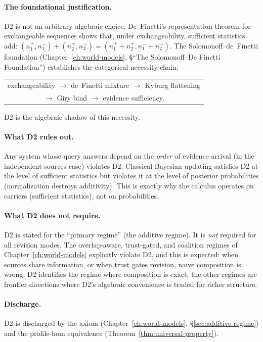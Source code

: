 \documentclass[11pt,openany]{report}
\begin{document}
\paragraph{The foundational justification.}
D2 is not an arbitrary algebraic choice.  De~Finetti's representation
theorem for exchangeable sequences shows that, under exchangeability,
sufficient statistics add: $(n_1^+, n_1^-) + (n_2^+, n_2^-) =
(n_1^+ + n_2^+, n_1^- + n_2^-)$.  The Solomonoff--de~Finetti
foundation (Chapter~\ref{ch:world-models}, \S``The Solomonoff--De
Finetti Foundation'') establishes the categorical necessity chain:
%
\begin{center}
\begin{tabular}{@{}c@{}}
exchangeability $\to$ de~Finetti mixture $\to$ Kyburg flattening \\
$\to$ Giry bind $\to$ evidence sufficiency.
\end{tabular}
\end{center}
%
\noindent
D2 is the algebraic shadow of this necessity.

\paragraph{What D2 rules out.}
Any system whose query answers depend on the \emph{order} of evidence
arrival (in the independent-sources case) violates D2.  Classical
Bayesian updating satisfies D2 at the level of sufficient statistics
but violates it at the level of posterior probabilities (normalization
destroys additivity).  This is exactly why the calculus operates on
carriers (sufficient statistics), not on probabilities.

\paragraph{What D2 does not require.}
D2 is stated for the ``primary regime'' (the additive regime).  It is
\emph{not} required for all revision modes.  The overlap-aware,
trust-gated, and coalition regimes of Chapter~\ref{ch:world-models}
explicitly violate D2, and this is expected: when sources share
information, or when trust gates revision, naive composition is wrong.
D2 identifies the regime where composition is exact; the other regimes
are frontier directions where D2's algebraic convenience is traded for
richer structure.

\paragraph{Discharge.}
D2 is discharged by the  axiom
 (Chapter~\ref{ch:world-models},
\S\ref{sec:additive-regime}) and the profile-hom equivalence
(Theorem~\ref{thm:universal-property}).
\end{document}
